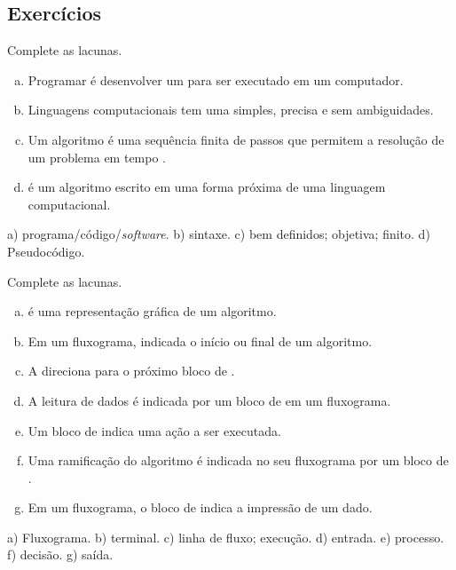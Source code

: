 \subsection{Exercícios}

\begin{exer}
  Complete as lacunas.
  \begin{enumerate}[a)]
    \item Programar é desenvolver um \underline{} para ser executado em um computador.
    \item Linguagens computacionais tem uma \underline{\phantom{sintaxe}} simples, precisa e sem ambiguidades.
    \item Um algoritmo é uma sequência finita de passos \underline{\phantom{bem definidos}} que permitem a resolução \underline{\phantom{objetiva}} de um problema em tempo \underline{\phantom{finito}}.
    \item \underline{\phantom{Pseudocódigo}} é um algoritmo escrito em uma forma próxima de uma linguagem computacional.
  \end{enumerate}
\end{exer}
\begin{resp}
  a) programa/código/\textit{software}. b) sintaxe. c) bem definidos; objetiva; finito. d) Pseudocódigo.
\end{resp}

\begin{exer}
  Complete as lacunas.
  \begin{enumerate}[a)]
    \item \underline{\phantom{Fluxograma}} é uma representação gráfica de um algoritmo.
    \item Em um fluxograma, \underline{\phantom{terminal}} indicada o início ou final de um algoritmo.
    \item A \underline{\phantom{linha de fluxo}} direciona para o próximo bloco de \underline{\phantom{execução}}.
    \item A leitura de dados é indicada por um bloco de \underline{\phantom{entrada}} em um fluxograma.
    \item Um bloco de \underline{\phantom{processo}} indica uma ação a ser executada.
    \item Uma ramificação do algoritmo é indicada no seu fluxograma por um bloco de \underline{\phantom{decisão}}.
    \item Em um fluxograma, o bloco de \underline{\phantom{saída}} indica a impressão de um dado.
  \end{enumerate} 
\end{exer}
\begin{resp}
  a) Fluxograma. b) terminal. c) linha de fluxo; execução. d) entrada. e) processo. f) decisão. g) saída.
\end{resp}

